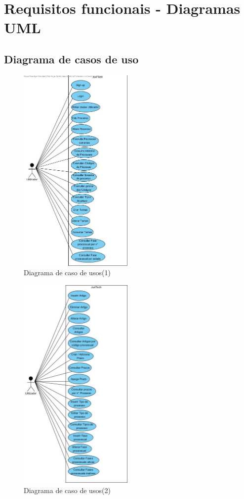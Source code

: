 \section{Requisitos funcionais - Diagramas UML}

\subsection{Diagrama de casos de uso}
\begin{figure}[!h]
\centering
\includegraphics[width=0.5\textwidth]{Figuras/caso_de_uso_1.jpg}
\caption{Diagrama de caso de usos(1)}
\label{d.cdu}
\end{figure}
\newpage

\begin{figure}[!h]
\centering
\includegraphics[width=0.5\textwidth]{Figuras/caso_de_uso_2.jpg}
\caption{Diagrama de caso de usos(2)}
\label{d.cdu}
\end{figure}
\newpage

